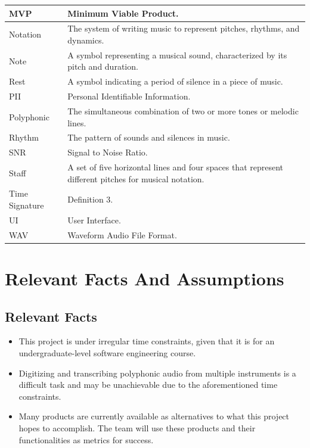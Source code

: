 \documentclass[12pt]{article}
\begin{document}
\begin{longtable}{|l|p{12cm}|}
\hline
MVP & Minimum Viable Product. \\ 
\hline
Notation & The system of writing music to represent pitches, rhythms, and dynamics. \\ 
\hline
Note & A symbol representing a musical sound, characterized by its pitch and duration. \\ 
\hline
Rest & A symbol indicating a period of silence in a piece of music. \\ 
\hline
PII & Personal Identifiable Information. \\ 
\hline
Polyphonic & The simultaneous combination of two or more tones or melodic lines. \\ 
\hline
Rhythm & The pattern of sounds and silences in music. \\ 
\hline
SNR & Signal to Noise Ratio. \\ 
\hline
Staff & A set of five horizontal lines and four spaces that represent different pitches for musical notation. \\ 
\hline
Time Signature & Definition 3. \\ 
\hline
UI & User Interface. \\ 
\hline
WAV & Waveform Audio File Format. \\ 
\hline

\end{longtable}

\section{Relevant Facts And Assumptions}
\subsection{Relevant Facts}
\begin{itemize}
  \item This project is under irregular time constraints, given that it is 
  for an undergraduate-level software engineering course. 
  \item Digitizing and transcribing polyphonic audio from multiple instruments
   is a difficult task and may be unachievable due to the aforementioned time constraints. 
  \item Many products are currently available as alternatives to what this project hopes 
  to accomplish. The team will use these products and their functionalities as metrics for success.
\end{itemize}
\end{document}

